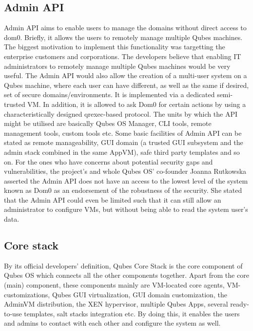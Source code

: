 \documentclass[runningheads,a4paper]{article}
\begin{document}
\subsection{Admin API}
Admin API aims to enable users to manage the domains without direct access to dom0. Briefly, it allows the users to remotely manage multiple Qubes machines. The biggest motivation to implement this functionality was targetting the enterprise customers and corporations. The developers believe that enabling IT administrators to remotely manage multiple Qubes machines would be very useful. The Admin API would also allow the creation of a multi-user system on a Qubes machine, where each user can have different, as well as the same if desired, set of secure domains/environments. It is implemented via a dedicated semi-trusted VM. In addition, it is allowed to ask Dom0 for certain actions by using a characteristically designed qrexec-based protocol. The units by which the API might be utilised are basically Qubes OS Manager, CLI tools, remote management tools, custom tools etc. Some basic facilities of Admin API can be stated as remote manageability, GUI domain (a trusted GUI subsystem and the admin stack combined in the same AppVM), safe third party templates and so on. For the ones who have concerns about potential security gaps and vulnerabilities, the project’s and whole Qubes OS’ co-founder Joanna Rutkowska asserted the Admin API does not have an access to the lowest level of the system known as Dom0 as an endorsement of the robustness of the security. She stated that the Admin API could even be limited such that it can still allow an administrator to configure VMs, but without being able to read the system user’s data. 

\subsection{Core stack}
By its official developers’ definition, Qubes Core Stack is the core component of Qubes OS which connects all the other components together. Apart from the core (main) component, these components mainly are VM-located core agents, VM-customizations, Qubes GUI virtualization, GUI domain customization, the AdminVM distribution, the XEN hypervisor, multiple Qubes Apps, several ready-to-use templates, salt stacks integration etc.
By doing this, it enables the users and admins to contact with each other and configure the system as well. 
\end{document}
